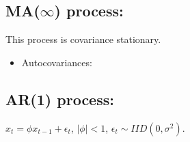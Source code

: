 %
%
%


\subsection{MA(\(\infty\)) process:} 

This process is covariance stationary.

\begin{itemize}

\item Autocovariances:

\end{itemize}


\subsection{AR(1) process:} \label{ts.ar1} \(x_t = \phi x_{t-1} + \epsilon_t\), \(|\phi| < 1\), \(\epsilon_t \sim IID(0, \sigma^2)\). 

